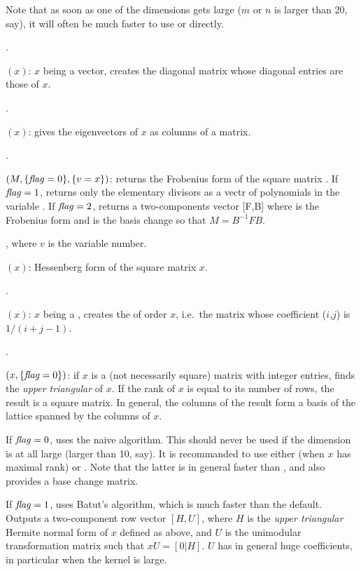 Note that as soon as one of the dimensions gets large ($m$ or $n$ is larger
than 20, say), it will often be much faster to use  or
 directly.

.

$(x)$: $x$ being a vector, creates the diagonal matrix
whose diagonal entries are those of $x$.

.

$(x)$: gives the eigenvectors of $x$ as columns of a
matrix.

.

$(M,\{\hbox{\it f\kern0pt lag\/}=0\},\{v=x\})$: returns the Frobenius form of
the square matrix . If $\hbox{\it f\kern0pt lag\/}=1$, returns only the elementary divisors as
a vectr of polynomials in the variable .  If $\hbox{\it f\kern0pt lag\/}=2$, returns a
two-components vector [F,B] where  is the Frobenius form and  is
the basis change so that $M=B^{-1}FB$.

, where $v$ is the variable number.

$(x)$: Hessenberg form of the square matrix $x$.

.

$(x)$: $x$ being a , creates the
of order $x$, i.e.~the matrix whose coefficient
($i$,$j$) is $1/ (i+j-1)$.

.

$(x,\{\hbox{\it f\kern0pt lag\/}=0\})$: if $x$ is a (not necessarily square)
matrix with integer entries, finds the \emph{upper triangular}
 of $x$. If the rank of $x$ is equal to its number
of rows, the result is a square matrix. In general, the columns of the result
form a basis of the lattice spanned by the columns of $x$.

If $\hbox{\it f\kern0pt lag\/}=0$, uses the naive algorithm. This should never be used if the
dimension is at all large (larger than 10, say). It is recommanded to use
either  (when $x$ has maximal rank) or
. Note that the latter is in general faster than
, and also provides a base change matrix.

If $\hbox{\it f\kern0pt lag\/}=1$, uses Batut's algorithm, which is much faster than the default.
Outputs a two-component row vector $[H,U]$, where $H$ is the \emph{upper
triangular} Hermite normal form of $x$ defined as above,  and $U$ is the
unimodular transformation matrix such that $xU=[0|H]$. $U$ has in general
huge coefficients, in particular when the kernel is large.

